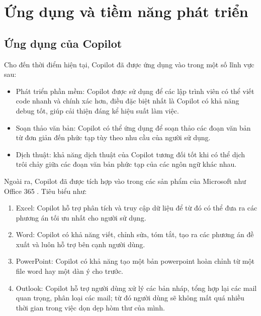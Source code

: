 \chapter{Ứng dụng và tiềm năng phát triển}
\section{Ứng dụng của Copilot}
Cho đến thời điểm hiện tại, Copilot đã được ứng dụng vào trong một số lĩnh vực sau:
\begin{itemize}
    \item Phát triển phần mềm: Copilot được sử dụng để các lập trình viên có thể viết code nhanh và chính xác hơn, điều đặc biệt nhất là Copilot có khả năng debug tốt, giúp cải thiện đáng kể hiệu suất làm việc.
    \item Soạn thảo văn bản: Copilot có thể ứng dụng để soạn thảo các đoạn văn bản từ đơn giản đến phức tạp tùy theo nhu cầu của người sử dụng.
    \item Dịch thuật: khả năng dịch thuật của Copilot tương đối tốt khi có thể dịch trôi chảy giữa các đoạn văn bản phức tạp của các ngôn ngữ khác nhau.
\end{itemize}
Ngoài ra, Copilot đã được tích hợp vào trong các sản phẩm của Microsoft như Office 365 \cite{link_9}. Tiêu biểu như:
\begin{enumerate}
    \item Excel: Copilot hỗ trợ phân tích và truy cập dữ liệu để từ đó có thể đưa ra các phương án tối ưu nhất cho người sử dụng.
    \item Word: Copilot có khả năng viết, chỉnh sửa, tóm tắt, tạo ra các phương án đề xuất và luôn hỗ trợ bên cạnh người dùng.
    \item PowerPoint: Copilot có khả năng tạo một bản powerpoint hoàn chỉnh từ một file word hay một dàn ý cho trước.
    \item Outlook: Copilot hỗ trợ người dùng xử lý các bản nháp, tổng hợp lại các mail quan trọng, phân loại các mail; từ đó người dùng sẽ không mất quá nhiều thời gian trong việc dọn dẹp hòm thư của mình.
\end{enumerate}
